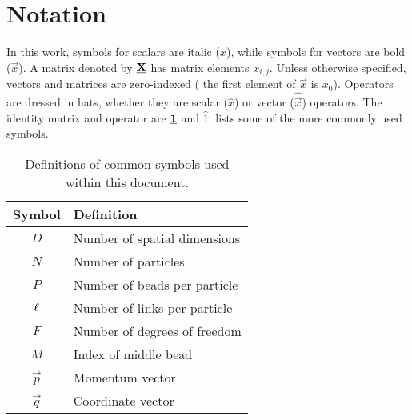 \chapter{Notation}

In this work, symbols for scalars are italic ($x$), while symbols for vectors are bold ($\vec{x}$).
A matrix denoted by $\underline{\bm{\mathbf{X}}}$ has matrix elements $x_{i,j}$.
Unless otherwise specified, vectors and matrices are zero-indexed (\ie{} the first element of $\vec{x}$ is $x_0$).
Operators are dressed in hats, whether they are scalar ($\hat{x}$) or vector ($\hat{\vec{x}}$) operators.
The identity matrix and operator are $\underline{\bm{\mathbf{1}}}$ and $\hat{1}$.
 lists some of the more commonly used symbols.

\begin{table}[h]
	\renewcommand*\arraystretch{1.2}
	\begin{center}
	\begin{tabular}{ c l }
		\toprule
		Symbol & Definition \\
		\midrule
		$D$ & Number of spatial dimensions \\
		$N$ & Number of particles \\
		$P$ & Number of beads per particle \\
		$\ell$ & Number of links per particle \\
		$F$ & Number of degrees of freedom \\
		$M$ & Index of middle bead \\
		$\vec{p}$ & Momentum vector \\
		$\vec{q}$ & Coordinate vector \\
		\bottomrule
	\end{tabular}
	\end{center}
	\caption[
		Definitions of common symbols
	]{
		Definitions of common symbols used within this document.
	}
	\label{tab:symbols}
\end{table}

